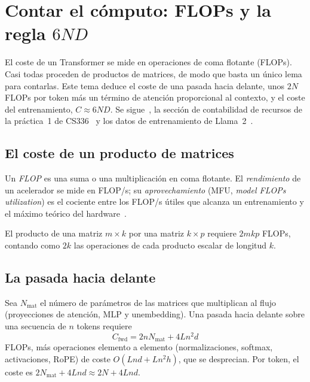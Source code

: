 \chapter{Contar el cómputo: FLOPs y la regla \texorpdfstring{$6ND$}{6ND}}
\label{tema:6}

El coste de un Transformer se mide en operaciones de coma flotante (FLOPs). Casi todas proceden de productos de matrices, de modo que basta un único lema para contarlas. Este tema deduce el coste de una pasada hacia delante, unos $2N$ FLOPs por token más un término de atención proporcional al contexto, y el coste del entrenamiento, $C\approx 6ND$. Se sigue~\cite[§2.1]{kaplan}, la sección de contabilidad de recursos de la práctica~1 de CS336~\cite[§3.5]{cs336} y los datos de entrenamiento de Llama~2~\cite[§2.2.1 y tabla~2]{llama2}.

\section{El coste de un producto de matrices}

\begin{definicion}[FLOP]
Un \emph{FLOP} es una suma o una multiplicación en coma flotante. El \emph{rendimiento} de un acelerador se mide en FLOP/s; su \emph{aprovechamiento} (MFU, \emph{model FLOPs utilization}) es el cociente entre los FLOP/s útiles que alcanza un entrenamiento y el máximo teórico del hardware~\cite[problema \texttt{adamw\_accounting}]{cs336}.
\end{definicion}

\begin{lema}\label{lem:2mkp}
El producto de una matriz $m\times k$ por una matriz $k\times p$ requiere $2mkp$ FLOPs, contando como $2k$ las operaciones de cada producto escalar de longitud $k$.
\end{lema}

\section{La pasada hacia delante}

\begin{proposicion}\label{prop:forward}
Sea $N_{\mathrm{mat}}$ el número de parámetros de las matrices que multiplican al flujo (proyecciones de atención, MLP y unembedding). Una pasada hacia delante sobre una secuencia de $n$ tokens requiere
\[
C_{\mathrm{fwd}}=2nN_{\mathrm{mat}}+4Ln^{2}d
\]
FLOPs, más operaciones elemento a elemento (normalizaciones, softmax, activaciones, RoPE) de coste $O(Lnd+Ln^{2}h)$, que se desprecian. Por token, el coste es $2N_{\mathrm{mat}}+4Lnd\approx 2N+4Lnd$.
\end{proposicion}

